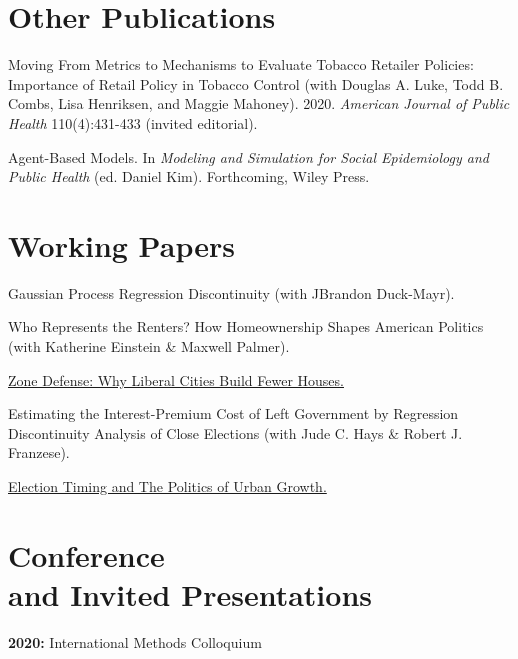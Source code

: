 \documentclass[margin,line]{res}
\newenvironment{publist}{
	\begin{list}{}{%
			\setlength{\itemsep}{0.15in}
			\setlength{\parsep}{0in} \setlength{\parskip}{0in}
			\setlength{\topsep}{0in} \setlength{\partopsep}{0in} 
			\setlength{\leftmargin}{0.15in}
			\setlength{\itemindent}{-0.15in}}}
		{\end{list}}
\begin{document}
\begin{resume}
\section{\sc Other Publications}


\begin{publist}
	\item Moving From Metrics to Mechanisms to Evaluate Tobacco Retailer Policies: Importance of Retail Policy in Tobacco Control (with Douglas A. Luke, Todd B. Combs, Lisa Henriksen, and Maggie Mahoney). 2020. \textit{American Journal of Public Health} 110(4):431-433 (invited editorial).
	\item Agent-Based Models. In \textit{Modeling and Simulation for Social Epidemiology and Public Health} (ed. Daniel Kim). Forthcoming, Wiley Press. 
\end{publist}



\section{\sc Working Papers}

\begin{publist}
	\item Gaussian Process Regression Discontinuity (with JBrandon Duck-Mayr).
	\item Who Represents the Renters? How Homeownership Shapes American Politics (with Katherine Einstein \& Maxwell Palmer). 
	\item \href{https://joeornstein.github.io/publications/ornstein-zone-defense.pdf}{Zone Defense: Why Liberal Cities Build Fewer Houses.}
	\item Estimating the Interest-Premium Cost of Left Government by Regression Discontinuity Analysis of Close Elections (with Jude C. Hays \& Robert J. Franzese).
	\item \href{https://joeornstein.github.io/publications/Ornstein-ElectionTiming.pdf}{Election Timing and The Politics of Urban Growth.}
\end{publist}

\section{\sc Conference \\and Invited Presentations}

\textbf{2020:} International Methods Colloquium 


\end{resume}
\end{document}
